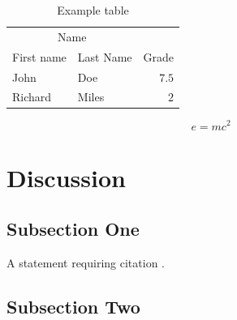 \documentclass[twoside,twocolumn]{article}
\begin{document}
\begin{table}
\caption{Example table}
\centering
\begin{tabular}{llr}
\toprule
\multicolumn{2}{c}{Name} \\
\cmidrule(r){1-2}
First name & Last Name & Grade \\
\midrule
John & Doe & $7.5$ \\
Richard & Miles & $2$ \\
\bottomrule
\end{tabular}
\end{table}

\blindtext %

\begin{equation}
\label{eq:emc}
e = mc^2
\end{equation}

\blindtext %


\section{Discussion}

\subsection{Subsection One}

A statement requiring citation \cite{sorourifar2021data}.
\blindtext %

\subsection{Subsection Two}

\blindtext %



\end{document}

